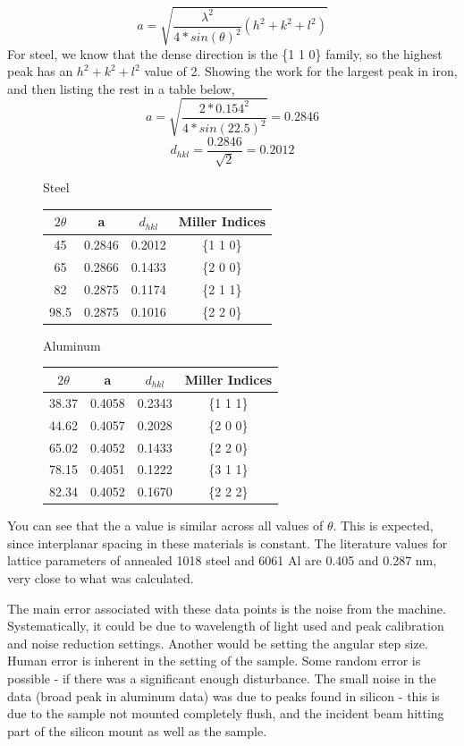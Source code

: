 \documentclass{article}
\begin{document}
$$a = \sqrt{\frac{\lambda ^2}{4*sin(\theta)^2}(h^2+k^2+l^2)}$$
For steel, we know that the dense direction is the \{1 1 0\} family, so the highest peak has an $h^2+k^2+l^2$ value of 2.  Showing the work for the largest peak in iron, and then listing the rest in a table below,
$$a = \sqrt{\frac{2*0.154^2}{4*sin(22.5)^2}} = 0.2846$$
$$d_{hkl} = \frac{0.2846}{\sqrt{2}} = 0.2012$$

\begin{figure}[h]
	\begin{minipage}{0.5\textwidth}
		\centering
		Steel
		
		\begin{tabular}{|| c | c | c | c ||}
		 \hline
		 $2\theta$ & a & $d_{hkl}$ & Miller Indices\\
		 \hline
		 \hline
		 45 & 0.2846 & 0.2012 & \{1 1 0\}\\
		 \hline
		 65 & 0.2866 & 0.1433 & \{2 0 0\}\\
		 \hline
		 82 & 0.2875 & 0.1174 & \{2 1 1\}\\
		 \hline
		 98.5 & 0.2875 & 0.1016 & \{2 2 0\}\\
		 \hline
		\end{tabular}
	\end{minipage}
	\begin{minipage}{0.5\textwidth}
		\centering
		Aluminum
		
		\begin{tabular}{|| c | c | c | c ||}
		 \hline
		 $2\theta$ & a & $d_{hkl}$ & Miller Indices\\
		 \hline
		 \hline
		 38.37 & 0.4058 & 0.2343 & \{1 1 1\}\\
		 \hline
		 44.62 & 0.4057 & 0.2028 & \{2 0 0\}\\
		 \hline
		 65.02 & 0.4052 & 0.1433 & \{2 2 0\}\\
		 \hline
		 78.15 & 0.4051 & 0.1222 & \{3 1 1\}\\
		 \hline
		 82.34 & 0.4052 & 0.1670 & \{2 2 2\}\\
		 \hline
		\end{tabular}
	\end{minipage}
\end{figure}

You can see that the a value is similar across all values of $\theta$. This is expected, since interplanar spacing in these materials is constant. The literature values for lattice parameters of annealed 1018 steel and 6061 Al are 0.405 and 0.287 nm, very close to what was calculated.

The main error associated with these data points is the noise from the machine. Systematically, it could be due to wavelength of light used and peak calibration and noise reduction settings. Another would be setting the angular step size. Human error is inherent in the setting of the sample. Some random error is possible - if there was a significant enough disturbance. The small noise in the data (broad peak in aluminum data) was due to peaks found in silicon - this is due to the sample not mounted completely flush, and the incident beam hitting part of the silicon mount as well as the sample.
\end{document}
